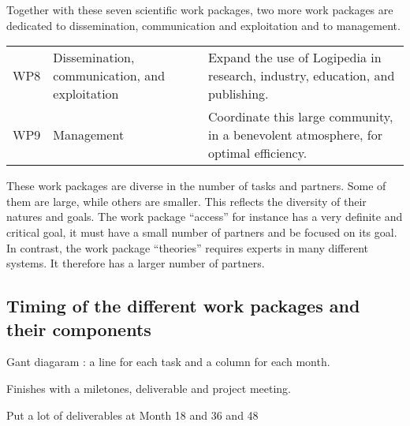 Together with these seven scientific work packages, 
two more work packages are dedicated to dissemination, communication and
exploitation and to management.

\begin{longtable}{|p{}|p{}|p{}|}
\hline
\rowcolor{cyan}\multicolumn{3}{|l|}{\bf Dissemination, communication, exploitation, and management:}\\
\hline
WP8
&
Dissemination, communication, and exploitation
&
Expand the use of Logipedia in research, industry, education, and publishing.
\\
\hline
WP9
&
Management
&
Coordinate this large community, in a benevolent atmosphere, for optimal
efficiency.
\\
\hline
\end{longtable}

These work packages are diverse in the number of tasks and
partners. Some of them are large, while others are smaller. This
reflects the diversity of their natures and goals. The work package
``access'' for instance has a very definite and critical goal, it must
have a small number of partners and be focused on its goal. In
contrast, the work package ``theories'' requires experts in many
different systems.  It therefore has a larger number of partners.

\wpfigstyle{\scriptsize\setlength{\tabcolsep}{2pt}}
\wpfig%

\subsection{Timing of the different work packages and their components}

Gant diagaram : a line for each task
and a column for each month.

Finishes with a miletones, deliverable and project meeting.

Put a lot of deliverables at Month 18 and 36 and 48

\ganttchart[draft,xscale=.32] 


